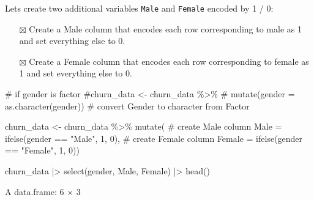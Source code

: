 \documentclass[
  letterpaper,
  DIV=11,
  numbers=noendperiod]{scrreprt}
\newenvironment{Shaded}{\begin{snugshade}}{\end{snugshade}}
\newcommand{\AttributeTok}[1]{\textcolor[rgb]{0.40,0.45,0.13}{#1}}
\newcommand{\CommentTok}[1]{\textcolor[rgb]{0.37,0.37,0.37}{#1}}
\newcommand{\DecValTok}[1]{\textcolor[rgb]{0.68,0.00,0.00}{#1}}
\newcommand{\FunctionTok}[1]{\textcolor[rgb]{0.28,0.35,0.67}{#1}}
\newcommand{\NormalTok}[1]{\textcolor[rgb]{0.00,0.23,0.31}{#1}}
\newcommand{\OtherTok}[1]{\textcolor[rgb]{0.00,0.23,0.31}{#1}}
\newcommand{\SpecialCharTok}[1]{\textcolor[rgb]{0.37,0.37,0.37}{#1}}
\newcommand{\StringTok}[1]{\textcolor[rgb]{0.13,0.47,0.30}{#1}}
\providecommand{\tightlist}{%
  \setlength{\itemsep}{0pt}\setlength{\parskip}{0pt}}\usepackage{longtable,booktabs,array}
\begin{document}
Lets create two additional variables \texttt{Male} and \texttt{Female}
encoded by 1 / 0:

\begin{itemize}
\tightlist
\item[$\boxtimes$]
  Create a Male column that encodes each row corresponding to male as 1
  and set everything else to 0.
\item[$\boxtimes$]
  Create a Female column that encodes each row corresponding to female
  as 1 and set everything else to 0.
\end{itemize}

\begin{Shaded}
\begin{Highlighting}[]
\CommentTok{\# if gender is factor}
\CommentTok{\#churn\_data \textless{}{-} churn\_data \%\textgreater{}\% }
   \CommentTok{\#     mutate(gender = as.character(gender)) \# convert Gender to character from Factor}

\NormalTok{churn\_data }\OtherTok{\textless{}{-}}\NormalTok{ churn\_data }\SpecialCharTok{\%\textgreater{}\%} 
        \FunctionTok{mutate}\NormalTok{(}
            \CommentTok{\# create Male column}
            \AttributeTok{Male =} \FunctionTok{ifelse}\NormalTok{(gender }\SpecialCharTok{==} \StringTok{"Male"}\NormalTok{, }\DecValTok{1}\NormalTok{, }\DecValTok{0}\NormalTok{),}
            \CommentTok{\# create Female column}
            \AttributeTok{Female =} \FunctionTok{ifelse}\NormalTok{(gender }\SpecialCharTok{==} \StringTok{"Female"}\NormalTok{, }\DecValTok{1}\NormalTok{, }\DecValTok{0}\NormalTok{))}

\NormalTok{churn\_data }\SpecialCharTok{|\textgreater{}} \FunctionTok{select}\NormalTok{(gender, Male, Female) }\SpecialCharTok{|\textgreater{}} \FunctionTok{head}\NormalTok{()}
\end{Highlighting}
\end{Shaded}

A data.frame: 6 × 3
\end{document}
